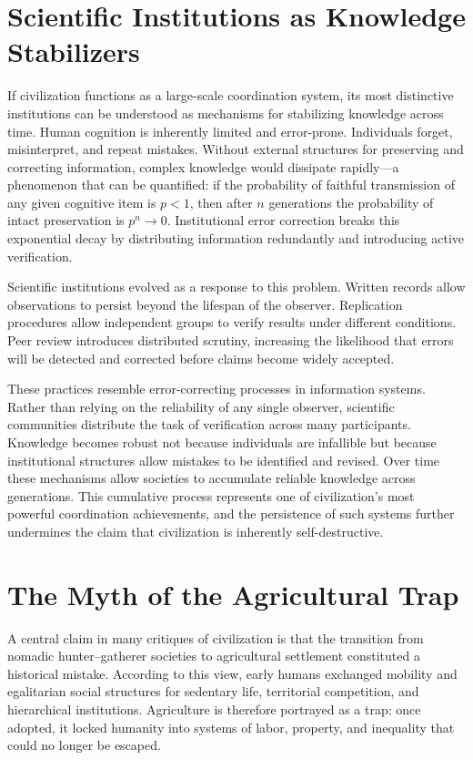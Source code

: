 \documentclass[12pt]{article}
\begin{document}
\section{Scientific Institutions as Knowledge Stabilizers}

If civilization functions as a large-scale coordination system, its most distinctive institutions can be understood as mechanisms for stabilizing knowledge across time. Human cognition is inherently limited and error-prone. Individuals forget, misinterpret, and repeat mistakes. Without external structures for preserving and correcting information, complex knowledge would dissipate rapidly---a phenomenon that can be quantified: if the probability of faithful transmission of any given cognitive item is $p < 1$, then after $n$ generations the probability of intact preservation is $p^n \to 0$. Institutional error correction breaks this exponential decay by distributing information redundantly and introducing active verification.

Scientific institutions evolved as a response to this problem. Written records allow observations to persist beyond the lifespan of the observer. Replication procedures allow independent groups to verify results under different conditions. Peer review introduces distributed scrutiny, increasing the likelihood that errors will be detected and corrected before claims become widely accepted.

These practices resemble error-correcting processes in information systems. Rather than relying on the reliability of any single observer, scientific communities distribute the task of verification across many participants. Knowledge becomes robust not because individuals are infallible but because institutional structures allow mistakes to be identified and revised. Over time these mechanisms allow societies to accumulate reliable knowledge across generations. This cumulative process represents one of civilization's most powerful coordination achievements, and the persistence of such systems further undermines the claim that civilization is inherently self-destructive.

\section{The Myth of the Agricultural Trap}

A central claim in many critiques of civilization is that the transition from nomadic hunter--gatherer societies to agricultural settlement constituted a historical mistake. According to this view, early humans exchanged mobility and egalitarian social structures for sedentary life, territorial competition, and hierarchical institutions. Agriculture is therefore portrayed as a trap: once adopted, it locked humanity into systems of labor, property, and inequality that could no longer be escaped.
\end{document}
